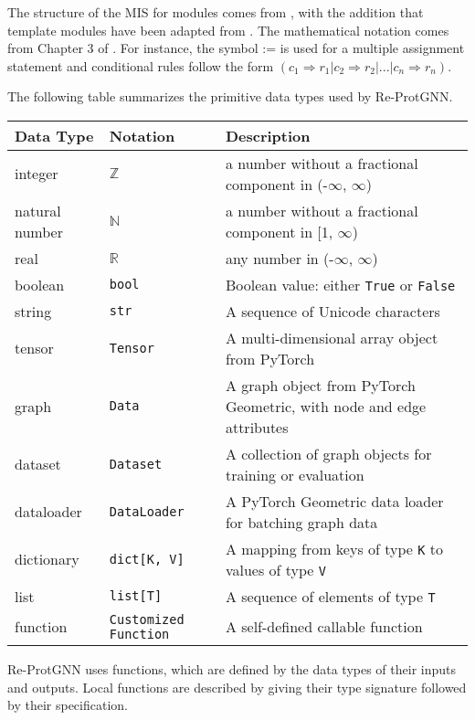 \documentclass[12pt, titlepage]{article}
\begin{document}
The structure of the MIS for modules comes from \citet{HoffmanAndStrooper1995},
with the addition that template modules have been adapted from
\cite{GhezziEtAl2003}.  The mathematical notation comes from Chapter 3 of
\citet{HoffmanAndStrooper1995}.  For instance, the symbol := is used for a
multiple assignment statement and conditional rules follow the form $(c_1
\Rightarrow r_1 | c_2 \Rightarrow r_2 | ... | c_n \Rightarrow r_n )$.

The following table summarizes the primitive data types used by Re-ProtGNN. 

\begin{center}
\renewcommand{\arraystretch}{1.2}
\noindent 
\begin{tabular}{l l p{7.5cm}} 
\toprule 
\textbf{Data Type} & \textbf{Notation} & \textbf{Description}\\ 
\midrule
integer & $\mathbb{Z}$ & a number without a fractional component in (-$\infty$, $\infty$) \\
natural number & $\mathbb{N}$ & a number without a fractional component in [1, $\infty$) \\
real & $\mathbb{R}$ & any number in (-$\infty$, $\infty$)\\
boolean & \texttt{bool} & Boolean value: either \texttt{True} or \texttt{False} \\
string & \texttt{str} & A sequence of Unicode characters \\
tensor & \texttt{Tensor} & A multi-dimensional array object from PyTorch \\
graph & \texttt{Data} & A graph object from PyTorch Geometric, with node and edge attributes \\
dataset & \texttt{Dataset} & A collection of graph objects for training or evaluation \\
dataloader & \texttt{DataLoader} & A PyTorch Geometric data loader for batching graph data \\
dictionary & \texttt{dict[K, V]} & A mapping from keys of type \texttt{K} to values of type \texttt{V} \\
list & \texttt{list[T]} & A sequence of elements of type \texttt{T} \\
function & \texttt{Customized Function} & A self-defined callable function\\
\bottomrule
\end{tabular} 
\end{center}

\noindent
Re-ProtGNN uses functions, which
are defined by the data types of their inputs and outputs. Local functions are
described by giving their type signature followed by their specification.
\end{document}
